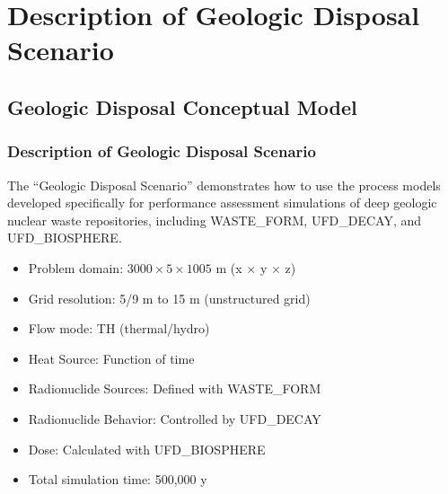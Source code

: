 \documentclass{beamer}
\newcommand\redcomment[1]{{{\color{red} #1}}}
\begin{document}
\section{Description of Geologic Disposal Scenario}

\subsection{Geologic Disposal Conceptual Model}

\begin{frame}\frametitle{Description of Geologic Disposal Scenario}
The ``Geologic Disposal Scenario'' demonstrates how to use the process models developed specifically for performance assessment simulations of deep geologic nuclear waste repositories, including \redcomment{WASTE\_FORM}, \redcomment{UFD\_DECAY}, and \redcomment{UFD\_BIOSPHERE}.
\begin{itemize}
  \item Problem domain: $3000 \times 5 \times 1005$ m (x $\times$ y $\times$ z)
  \item Grid resolution: 5/9 m to 15 m (unstructured grid)
  \item Flow mode: \redcomment{TH} (thermal/hydro)
  \item Heat Source: Function of time
  \item Radionuclide Sources: Defined with \redcomment{WASTE\_FORM}
  \item Radionuclide Behavior: Controlled by \redcomment{UFD\_DECAY}
  \item Dose: Calculated with \redcomment{UFD\_BIOSPHERE}
  \item Total simulation time: 500,000 y
\end{itemize}

\end{frame}

\end{document}
